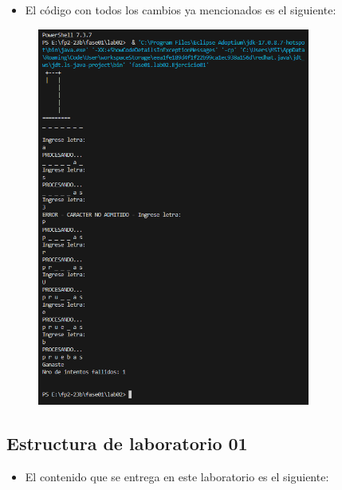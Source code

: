 \documentclass{article}
\begin{document}
    \newpage
    \begin{itemize}
        \item El código con todos los cambios ya mencionados es el siguiente: 
    \end{itemize}
	
    \begin{figure}[H]
		\centering
		\includegraphics[width=0.8\textwidth,keepaspectratio]{img/prueba01.png}
	\end{figure}
    
    \newpage
	\subsection{Estructura de laboratorio 01}
	\begin{itemize}	
		\item El contenido que se entrega en este laboratorio es el siguiente:
	\end{itemize}
	
\end{document}
